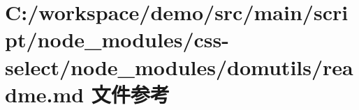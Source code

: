 \hypertarget{node__modules_2css-select_2node__modules_2domutils_2_r_e_a_d_m_e_8md}{}\section{C\+:/workspace/demo/src/main/script/node\+\_\+modules/css-\/select/node\+\_\+modules/domutils/readme.md 文件参考}
\label{node__modules_2css-select_2node__modules_2domutils_2_r_e_a_d_m_e_8md}
